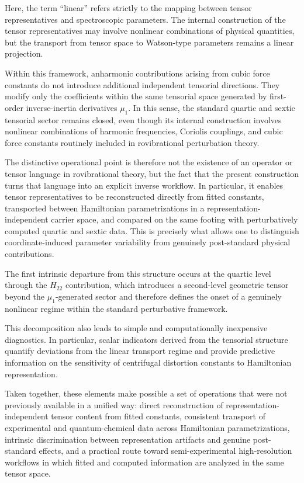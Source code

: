 \documentclass[aip,jcp,reprint,floatfix]{revtex4-2}
\begin{document}
Here, the term ``linear'' refers strictly to the mapping between tensor
representatives and spectroscopic parameters. The internal construction
of the tensor representatives may involve nonlinear combinations of
physical quantities, but the transport from tensor space to Watson-type
parameters remains a linear projection.

Within this framework, anharmonic contributions arising from cubic force
constants do not introduce additional independent tensorial directions.
They modify only the coefficients within the same tensorial space
generated by first-order inverse-inertia derivatives $\mu_1$. In this
sense, the standard quartic and sextic tensorial sector remains closed,
even though its internal construction involves nonlinear combinations of
harmonic frequencies, Coriolis couplings, and cubic force constants
routinely included in rovibrational perturbation theory.

The distinctive operational point is therefore not the existence of an
operator or tensor language in rovibrational theory, but the fact that
the present construction turns that language into an explicit inverse
workflow. In particular, it enables tensor representatives to be
reconstructed directly from fitted constants, transported between
Hamiltonian parametrizations in a representation-independent carrier
space, and compared on the same footing with perturbatively computed
quartic and sextic data. This is precisely what allows one to
distinguish coordinate-induced parameter variability from genuinely
post-standard physical contributions.

The first intrinsic departure from this structure occurs at the
quartic level through the $H_{22}$ contribution, which introduces a
second-level geometric tensor beyond the $\mu_1$-generated sector and
therefore defines the onset of a genuinely nonlinear regime within the
standard perturbative framework.

This decomposition also leads to simple and computationally inexpensive
diagnostics. In particular, scalar indicators derived from the
tensorial structure quantify deviations from the linear transport
regime and provide predictive information on the sensitivity of
centrifugal distortion constants to Hamiltonian representation.

Taken together, these elements make possible a set of operations that
were not previously available in a unified way: direct reconstruction
of representation-independent tensor content from fitted constants,
consistent transport of experimental and quantum-chemical data across
Hamiltonian parametrizations, intrinsic discrimination between
representation artifacts and genuine post-standard effects, and a
practical route toward semi-experimental high-resolution workflows in
which fitted and computed information are analyzed in the same tensor
space.
\end{document}

